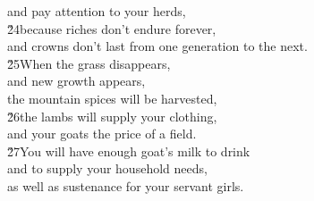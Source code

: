 \begin{poetry}
\poemll    and pay attention to your herds, \\
\poeml \v{24}because riches don't endure forever, \\
\poemll    and crowns don't last from one generation to the next. \\
\poeml \v{25}When the grass disappears, \\
\poemll    and new growth appears, \\
\poemlll       the mountain spices will be harvested, \\
\poeml \v{26}the lambs will supply your clothing, \\
\poemll    and your goats the price of a field. \\
\poeml \v{27}You will have enough goat's milk to drink \\
\poemll    and to supply your household needs, \\
\poemlll       as well as sustenance for your servant girls.
\end{poetry}

